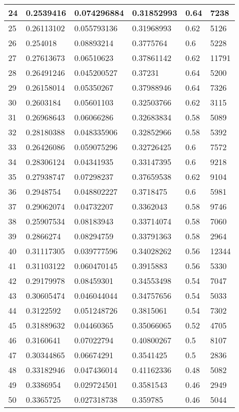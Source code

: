\begin{longtable}{|l|l|l|l|l|l|}
24 & 0.2539416 & 0.074296884 & 0.31852993 & 0.64 & 7238 \\ \hline 
25 & 0.26113102 & 0.055793136 & 0.31968993 & 0.62 & 5126 \\ \hline 
26 & 0.254018 & 0.08893214 & 0.3775764 & 0.6 & 5228 \\ \hline 
27 & 0.27613673 & 0.06510623 & 0.37861142 & 0.62 & 11791 \\ \hline 
28 & 0.26491246 & 0.045200527 & 0.37231 & 0.64 & 5200 \\ \hline 
29 & 0.26158014 & 0.05350267 & 0.37988946 & 0.64 & 7326 \\ \hline 
30 & 0.2603184 & 0.05601103 & 0.32503766 & 0.62 & 3115 \\ \hline 
31 & 0.26968643 & 0.06066286 & 0.32683834 & 0.58 & 5089 \\ \hline 
32 & 0.28180388 & 0.048335906 & 0.32852966 & 0.58 & 5392 \\ \hline 
33 & 0.26426086 & 0.059075296 & 0.32726425 & 0.6 & 7572 \\ \hline 
34 & 0.28306124 & 0.04341935 & 0.33147395 & 0.6 & 9218 \\ \hline 
35 & 0.27938747 & 0.07298237 & 0.37659538 & 0.62 & 9104 \\ \hline 
36 & 0.2948754 & 0.048802227 & 0.3718475 & 0.6 & 5981 \\ \hline 
37 & 0.29062074 & 0.04732207 & 0.3362043 & 0.58 & 9746 \\ \hline 
38 & 0.25907534 & 0.08183943 & 0.33714074 & 0.58 & 7060 \\ \hline 
39 & 0.2866274 & 0.08294759 & 0.33791363 & 0.58 & 2964 \\ \hline 
40 & 0.31117305 & 0.039777596 & 0.34028262 & 0.56 & 12344 \\ \hline 
41 & 0.31103122 & 0.060470145 & 0.3915883 & 0.56 & 5330 \\ \hline 
42 & 0.29179978 & 0.08459301 & 0.34553498 & 0.54 & 7047 \\ \hline 
43 & 0.30605474 & 0.046044044 & 0.34757656 & 0.54 & 5033 \\ \hline 
44 & 0.3122592 & 0.051248726 & 0.3815061 & 0.54 & 7302 \\ \hline 
45 & 0.31889632 & 0.04460365 & 0.35066065 & 0.52 & 4705 \\ \hline 
46 & 0.3160641 & 0.07022794 & 0.40800267 & 0.5 & 8107 \\ \hline 
47 & 0.30344865 & 0.06674291 & 0.3541425 & 0.5 & 2836 \\ \hline 
48 & 0.33182946 & 0.047436014 & 0.41162336 & 0.48 & 5082 \\ \hline 
49 & 0.3386954 & 0.029724501 & 0.3581543 & 0.46 & 2949 \\ \hline 
50 & 0.3365725 & 0.027318738 & 0.359785 & 0.46 & 5044 \\ \hline 
\end{longtable}